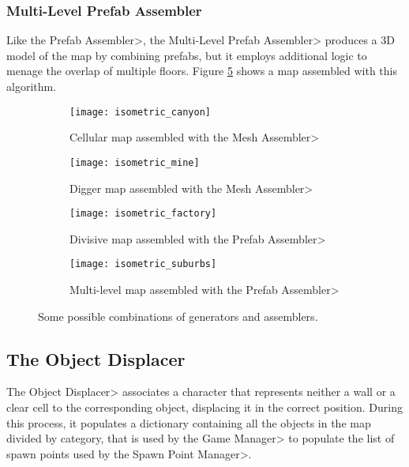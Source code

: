 
\subsubsection{Multi-Level Prefab Assembler}

Like the \<Prefab Assembler>, the \<Multi-Level Prefab Assembler> produces a 3D model of the map by combining prefabs, but it employs additional logic to menage the overlap of multiple floors. Figure \ref{fig:multi_assembled} shows a map assembled with this algorithm.

\begin{figure}[tp]
\centering
\begin{subfigure}[t]{0.48\linewidth}
\texttt{[image: isometric\_canyon]}
\caption{Cellular map assembled with the \<Mesh Assembler>}
\label{fig:cellular_assembled}
\end{subfigure}
\begin{subfigure}[t]{0.48\linewidth}
\texttt{[image: isometric\_mine]}
\caption{Digger map assembled with the \<Mesh Assembler>}
\label{fig:digger_assembled}
\end{subfigure}
\begin{subfigure}[t]{0.48\linewidth}
\texttt{[image: isometric\_factory]}
\caption{Divisive map assembled with the \<Prefab Assembler>}
\label{fig:divisive_assembled}
\end{subfigure}
\begin{subfigure}[t]{0.48\linewidth}
\texttt{[image: isometric\_suburbs]}
\caption{Multi-level map assembled with the \<Prefab Assembler>}
\label{fig:multi_assembled}
\end{subfigure}
\caption{Some possible combinations of generators and assemblers.}
\end{figure}


\subsection{The Object Displacer}

The \<Object Displacer> associates a character that represents neither a wall or a clear cell to the corresponding object, displacing it in the correct position. During this process, it populates a dictionary containing all the objects in the map divided by category, that is used by the \<Game Manager> to populate the list of spawn points used by the \<Spawn Point Manager>.


